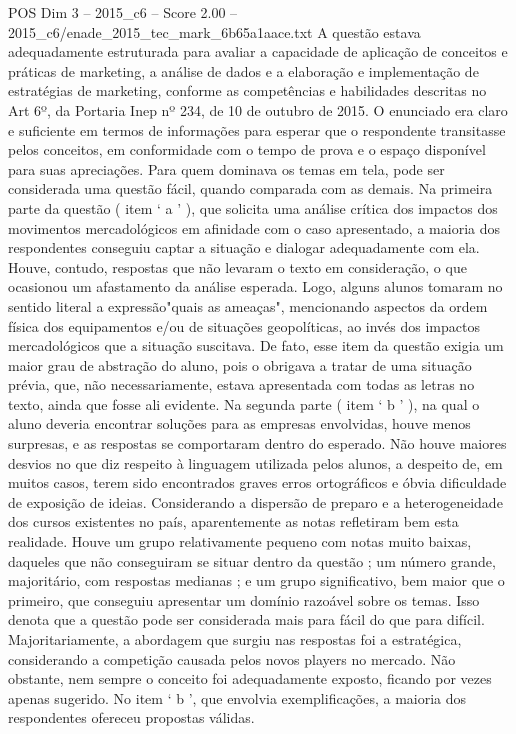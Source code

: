 \begin{textsample}{POS Dim 3 – 2015\_c6 – Score 2.00 – 2015\_c6/enade\_2015\_tec\_mark\_6b65a1aace.txt}
A questão estava adequadamente estruturada para avaliar a capacidade de aplicação de conceitos e práticas de marketing, a análise de dados e a elaboração e implementação de estratégias de marketing, conforme as competências e habilidades descritas no Art 6º, da Portaria Inep nº 234, de 10 de outubro de 2015.
O enunciado era claro e suficiente em termos de informações para esperar que o respondente transitasse pelos conceitos, em conformidade com o tempo de prova e o espaço disponível para suas apreciações.
Para quem dominava os temas em tela, pode ser considerada uma questão fácil, quando comparada com as demais.
Na primeira parte da questão ( item ‘ a ’ ), que solicita uma análise crítica dos impactos dos movimentos mercadológicos em afinidade com o caso apresentado, a maioria dos respondentes conseguiu captar a situação e dialogar adequadamente com ela.
Houve, contudo, respostas que não levaram o texto em consideração, o que ocasionou um afastamento da análise esperada.
Logo, alguns alunos tomaram no sentido literal a expressão"quais as ameaças", mencionando aspectos da ordem física dos equipamentos e/ou de situações geopolíticas, ao invés dos impactos mercadológicos que a situação suscitava.
De fato, esse item da questão exigia um maior grau de abstração do aluno, pois o obrigava a tratar de uma situação prévia, que, não necessariamente, estava apresentada com todas as letras no texto, ainda que fosse ali evidente.
Na segunda parte ( item ‘ b ’ ), na qual o aluno deveria encontrar soluções para as empresas envolvidas, houve menos surpresas, e as respostas se comportaram dentro do esperado.
Não houve maiores desvios no que diz respeito à linguagem utilizada pelos alunos, a despeito de, em muitos casos, terem sido encontrados graves erros ortográficos e óbvia dificuldade de exposição de ideias.
Considerando a dispersão de preparo e a heterogeneidade dos cursos existentes no país, aparentemente as notas refletiram bem esta realidade.
Houve um grupo relativamente pequeno com notas muito baixas, daqueles que não conseguiram se situar dentro da questão ; um número grande, majoritário, com respostas medianas ; e um grupo significativo, bem maior que o primeiro, que conseguiu apresentar um domínio razoável sobre os temas.
Isso denota que a questão pode ser considerada mais para fácil do que para difícil.
Majoritariamente, a abordagem que surgiu nas respostas foi a estratégica, considerando a competição causada pelos novos players no mercado.
Não obstante, nem sempre o conceito foi adequadamente exposto, ficando por vezes apenas sugerido.
No item ‘ b ’, que envolvia exemplificações, a maioria dos respondentes ofereceu propostas válidas.

\end{textsample}
